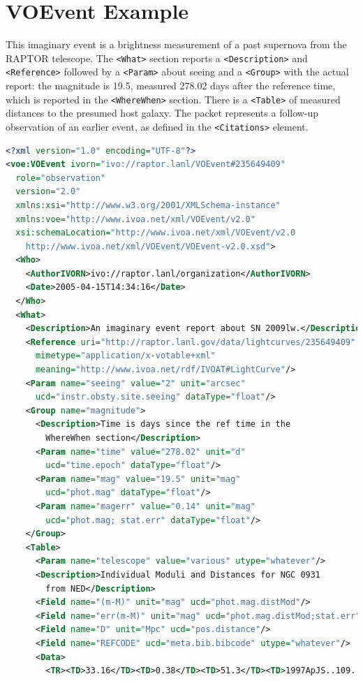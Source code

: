 \documentclass[11pt,a4paper]{ivoa}
\begin{document}
\section{VOEvent Example}
\label{sec:4}
This imaginary event is a brightness measurement of a past supernova from the RAPTOR \citep{bib10} telescope. The {\tt <What>} section reports a {\tt <Description>} and {\tt <Reference>} followed by a {\tt <Param>} about seeing and a {\tt <Group>} with the actual report: the magnitude is 19.5, measured 278.02 days after the reference time, which is reported in the {\tt <WhereWhen>} section. There is a {\tt <Table>} of measured distances to the presumed host galaxy. The packet represents a follow-up observation of an earlier event, as defined in the {\tt <Citations>} element. 
\begin{lstlisting}[language=XML]
<?xml version="1.0" encoding="UTF-8"?>
<voe:VOEvent ivorn="ivo://raptor.lanl/VOEvent#235649409" 
  role="observation" 
  version="2.0"
  xmlns:xsi="http://www.w3.org/2001/XMLSchema-instance"
  xmlns:voe="http://www.ivoa.net/xml/VOEvent/v2.0"
  xsi:schemaLocation="http://www.ivoa.net/xml/VOEvent/v2.0     
    http://www.ivoa.net/xml/VOEvent/VOEvent-v2.0.xsd">
  <Who>
    <AuthorIVORN>ivo://raptor.lanl/organization</AuthorIVORN>
    <Date>2005-04-15T14:34:16</Date>
  </Who>
  <What>
    <Description>An imaginary event report about SN 2009lw.</Description>
    <Reference uri="http://raptor.lanl.gov/data/lightcurves/235649409"
      mimetype="application/x-votable+xml" 
      meaning="http://www.ivoa.net/rdf/IVOAT#LightCurve"/>
    <Param name="seeing" value="2" unit="arcsec" 
      ucd="instr.obsty.site.seeing" dataType="float"/>
    <Group name="magnitude">
      <Description>Time is days since the ref time in the 
        WhereWhen section</Description>
      <Param name="time" value="278.02" unit="d" 
        ucd="time.epoch" dataType="float"/>
      <Param name="mag" value="19.5" unit="mag" 
        ucd="phot.mag" dataType="float"/>
      <Param name="magerr" value="0.14" unit="mag" 
        ucd="phot.mag; stat.err" dataType="float"/>
    </Group>
    <Table>
      <Param name="telescope" value="various" utype="whatever"/>
      <Description>Individual Moduli and Distances for NGC 0931 
        from NED</Description>
      <Field name="(m-M)" unit="mag" ucd="phot.mag.distMod"/>
      <Field name="err(m-M)" unit="mag" ucd="phot.mag.distMod;stat.err"/>
      <Field name="D" unit="Mpc" ucd="pos.distance"/>
      <Field name="REFCODE" ucd="meta.bib.bibcode" utype="whatever"/>
      <Data>
        <TR><TD>33.16</TD><TD>0.38</TD><TD>51.3</TD><TD>1997ApJS..109..333W</TD></TR>

\end{lstlisting}
\end{document}
